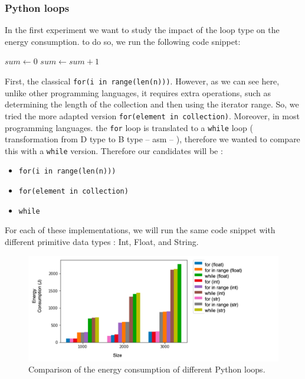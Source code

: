 \subsubsection{Python loops}
In the first experiment we want to study the impact of the loop type on the energy consumption. to do so, we run the following code snippet:
\begin{algorithm}[!htb]
    \begin{algorithmic}[1]
        \State $sum \gets 0$
        \State $sum \gets sum+1$
        \EndFor
        \State {}
    \end{algorithmic}
\end{algorithm}

First, the classical \texttt{for(i in range(len(n)))}.
However, as we can see here, unlike other programming languages, it requires extra operations, such as determining the length of the collection and then using the iterator range.
So, we tried the more adapted version \texttt{for(element in collection)}.
Moreover, in most programming languages. the \texttt{for} loop is translated to a \texttt{while} loop ( transformation from D type to B type -- asm -- ), therefore we wanted to compare this with a \texttt{while} version.
Therefore our candidates will be :

\begin{itemize}[]
    \item \texttt{for(i in range(len(n)))}
    \item \texttt{for(element in collection)}
    \item \texttt{while}
\end{itemize}

For each of these implementations, we will run the same code snippet with different primitive data types : Int, Float, and String.
\begin{figure}[!htb]
    \centering
    \includegraphics[width=\linewidth]{imgs/python_iterations}
    \caption{Comparison of the energy consumption of different Python loops.}
    \label{fig:pythonloops}
\end{figure}

